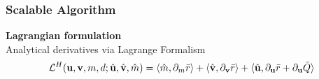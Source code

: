 \documentclass[10pt,xcolor=dvipsnames,compress]{beamer}
\begin{document}

\begin{frame}
\frametitle{{Scalable Algorithm}} 
\vfill
\textbf{Lagrangian formulation}\\
\small
Analytical derivatives via Lagrange Formalism
\vfill
\begin{equation*}
    \mathcal{L}^H (\mathbf{u},\mathbf{v},m,d; \hat{\mathbf{u}}, \hat{\mathbf{v}},\hat{m}) 
    =
    \langle  \hat{m}, \partial_m\Bar{r}  \rangle
    +
    \langle  \hat{\mathbf{v}}, \partial_\mathbf{v}\Bar{r}  \rangle
    +
     \langle  \hat{\mathbf{u}}, \partial_\mathbf{u}\Bar{r}+\partial_\mathbf{u}\Bar{Q}  \rangle 
\end{equation*}



\end{frame}
\end{document}
